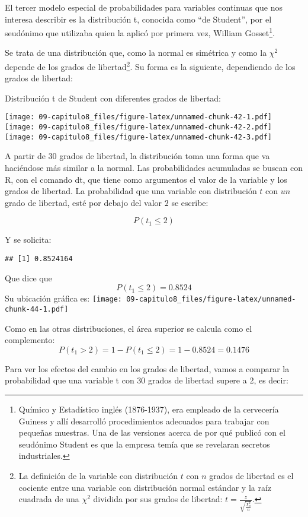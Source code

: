 \documentclass[]{article}
\let\rmarkdownfootnote\footnote%
\def\footnote{\protect\rmarkdownfootnote}
\begin{document}
El tercer modelo especial de probabilidades para variables continuas que
nos interesa describir es la distribución t, conocida como ``de
Student'', por el seudónimo que utilizaba quien la aplicó por primera
vez, William Gosset\footnote{Químico y Estadístico inglés (1876-1937),
  era empleado de la cervecería Guiness y allí desarrolló procedimientos
  adecuados para trabajar con pequeñas muestras. Una de las versiones
  acerca de por qué publicó con el seudónimo Student es que la empresa
  temía que se revelaran secretos industriales.}.

Se trata de una distribución que, como la normal es simétrica y como la
\(\chi^{2}\) depende de los grados de libertad\footnote{La definición de
  la variable con distribución \(t\) con \(n\) grados de libertad es el
  cociente entre una variable con distribución normal estándar y la raíz
  cuadrada de una \(\chi^{2}\) dividida por sus grados de libertad:
  \(t = \frac{z}{\sqrt{\frac{\chi_{n}^{2}}{n}}}\).}. Su forma es la
siguiente, dependiendo de los grados de libertad:

Distribución t de Student con diferentes grados de libertad:

\texttt{[image: 09-capitulo8\_files/figure-latex/unnamed-chunk-42-1.pdf]}
\texttt{[image: 09-capitulo8\_files/figure-latex/unnamed-chunk-42-2.pdf]}
\texttt{[image: 09-capitulo8\_files/figure-latex/unnamed-chunk-42-3.pdf]}

A partir de 30 grados de libertad, la distribución toma una forma que va
haciéndose más similar a la normal. Las probabilidades acumuladas se
buscan con R, con el comando dt, que tiene como argumentos el valor de
la variable y los grados de libertad. La probabilidad que una variable
con distribución \(t\) con \(un\) grado de libertad, esté por debajo del
valor \(2\) se escribe:

\[P(t_{1} \leq 2)\]

Y se solicita:

\begin{verbatim}
## [1] 0.8524164
\end{verbatim}

Que dice que \[P(t_{1} \leq 2)=0.8524\] Su ubicación gráfica es:
\texttt{[image: 09-capitulo8\_files/figure-latex/unnamed-chunk-44-1.pdf]}

Como en las otras distribuciones, el área superior se calcula como el
complemento: \[P(t_{1} > 2)=1-P(t_{1}\leq2)=1-0.8524=0.1476\]

Para ver los efectos del cambio en los grados de libertad, vamos a
comparar la probabilidad que una variable t con 30 grados de libertad
supere a 2, es decir:
\end{document}
